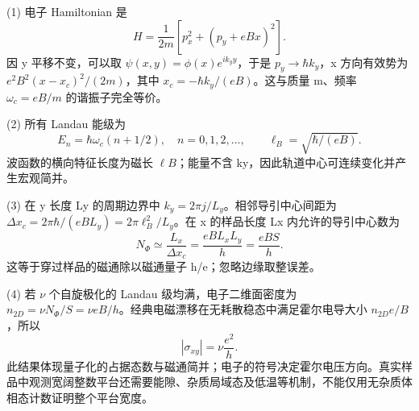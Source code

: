 (1) 电子 Hamiltonian 是
\[
H=\frac1{2m}[p_x^2+(p_y+eBx)^2].
\]
因 y 平移不变，可以取 \(\psi(x,y)=\phi(x)e^{ik_yy}\)，于是 \(p_y\to\hbar k_y\)，x 方向有效势为 \(e^2B^2(x-x_c)^2/(2m)\)，其中 \(x_c=-\hbar k_y/(eB)\)。这与质量 m、频率 \(\omega_c=eB/m\) 的谐振子完全等价。

(2) 所有 Landau 能级为
\[
E_n=\hbar\omega_c(n+1/2),\quad n=0,1,2,\ldots,
\qquad \ell_B=\sqrt{\hbar/(eB)}.
\]
波函数的横向特征长度为磁长 \(\ell B\)；能量不含 ky，因此轨道中心可连续变化并产生宏观简并。

(3) 在 y 长度 Ly 的周期边界中 \(k_y=2\pi j/L_y\)。相邻导引中心间距为 \(\Delta x_c=2\pi\hbar/(eBL_y)=2\pi\ell_B^2/L_y\)。在 x 的样品长度 Lx 内允许的导引中心数为
\[
N_\Phi\simeq\frac{L_x}{\Delta x_c}
=\frac{eB L_xL_y}{h}=\frac{eBS}{h}.
\]
这等于穿过样品的磁通除以磁通量子 h/e；忽略边缘取整误差。

(4) 若 \(\nu \) 个自旋极化的 Landau 级均满，电子二维面密度为 \(n_{2D}=\nu N_\Phi/S=\nu eB/h\)。经典电磁漂移在无耗散稳态中满足霍尔电导大小 \(n_{2D}e/B\)，所以
\[
|\sigma_{xy}|=\nu\frac{e^2}{h}.
\]
此结果体现量子化的占据态数与磁通简并；电子的符号决定霍尔电压方向。真实样品中观测宽阔整数平台还需要能隙、杂质局域态及低温等机制，不能仅用无杂质体相态计数证明整个平台宽度。
